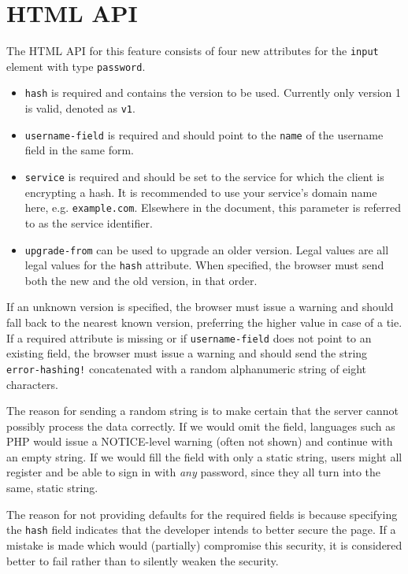 \documentclass{paper}
\newcommand{\code}[1]{\texttt{\colorbox{gray!11}{#1}}}
\begin{document}
\section{HTML API}

The HTML API for this feature consists of four new attributes for the \code{input} element
with type \code{password}.

\begin{itemize}
\item \code{hash} is required and contains the version to be used. Currently only version 1
is valid, denoted as \code{v1}.
\item \code{username-field} is required and should point to the \code{name} of the username
field in the same form.
\item \code{service} is required and should be set to the service for which the client is
encrypting a hash. It is recommended to use your service's domain name here, e.g.
\code{example.com}. Elsewhere in the document, this parameter is referred to as the service
identifier.
\item \code{upgrade-from} can be used to upgrade an older version. Legal values are all legal
values for the \code{hash} attribute. When specified, the browser must send both the new and
the old version, in that order.
\end{itemize}

If an unknown version is specified, the browser must issue a warning and should fall back to
the nearest known version, preferring the higher value in case of a tie. If a required
attribute is missing or if \code{username-field} does not point to an existing field, the
browser must issue a warning and should send the string \code{error-hashing!} concatenated
with a random alphanumeric string of eight characters.

The reason for sending a random string is to make certain that the server cannot possibly
process the data correctly. If we would omit the field, languages such as PHP would issue a
NOTICE-level warning (often not shown) and continue with an empty string. If we would fill
the field with only a static string, users might all register and be able to sign in with
{\it any} password, since they all turn into the same, static string.

The reason for not providing defaults for the required fields is because specifying the
\code{hash} field indicates that the developer intends to better secure the page. If a
mistake is made which would (partially) compromise this security, it is considered better to
fail rather than to silently weaken the security.
\end{document}
